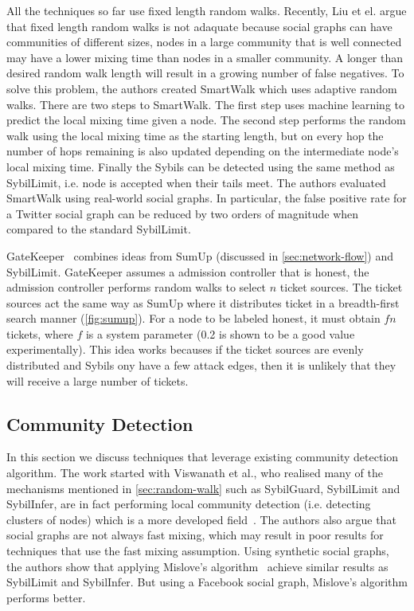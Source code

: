 All the techniques so far use fixed length random walks. Recently, Liu et el.
argue that fixed length random walks is not adaquate because social graphs can
have communities of different sizes, nodes in a large community that is well
connected may have a lower mixing time than nodes in a smaller community. A
longer than desired random walk length will result in a growing number of false
negatives. To solve this problem, the authors created
SmartWalk\cite{liu2016smartwalk} which uses adaptive random walks. There are two
steps to SmartWalk. The first step uses machine learning to predict the local
mixing time given a node. The second step performs the random walk using the
local mixing time as the starting length, but on every hop the number of hops
remaining is also updated depending on the intermediate node's local mixing
time. Finally the Sybils can be detected using the same method as SybilLimit,
i.e. node is accepted when their tails meet. The authors evaluated SmartWalk
using real-world social graphs. In particular, the false positive rate for a
Twitter social graph can be reduced by two orders of magnitude when compared to
the standard SybilLimit.

GateKeeper~\cite{tran2011optimal} combines ideas from SumUp (discussed in
\autoref{sec:network-flow}) and SybilLimit. GateKeeper assumes a admission
controller that is honest, the admission controller performs random walks to
select $n$ ticket sources. The ticket sources act the same way as SumUp where it
distributes ticket in a breadth-first search manner (\autoref{fig:sumup}). For a
node to be labeled honest, it must obtain $fn$ tickets, where $f$ is a system
parameter (0.2 is shown to be a good value experimentally). This idea works
becauses if the ticket sources are evenly distributed and Sybils ony have a few
attack edges, then it is unlikely that they will receive a large number of
tickets.


\subsection{Community Detection}\label{sec:community-detection}
In this section we discuss techniques that leverage existing community detection
algorithm. The work started with Viswanath et al., who realised many of the
mechanisms mentioned in \autoref{sec:random-walk} such as SybilGuard, SybilLimit
and SybilInfer, are in fact performing local community detection (i.e. detecting
clusters of nodes) which is a more developed field~\cite{viswanath2010analysis}.
The authors also argue that social graphs are not always fast mixing, which may
result in poor results for techniques that use the fast mixing assumption.
Using synthetic social graphs, the authors show that applying Mislove's
algorithm~\cite{mislove2010you} achieve similar results as SybilLimit and
SybilInfer. But using a Facebook social graph, Mislove's algorithm performs
better.

